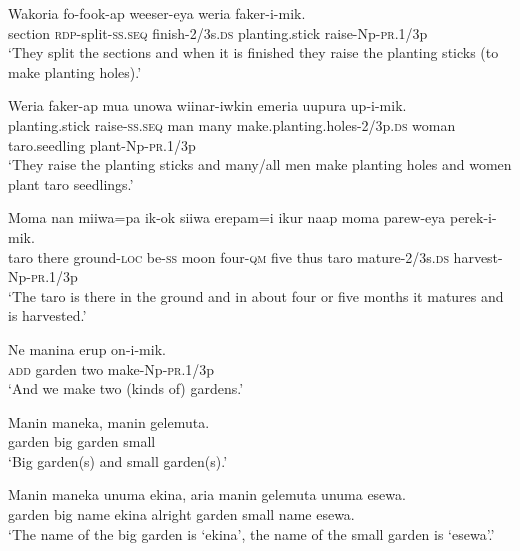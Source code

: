 \ea\label{ex:a:x7}
\gll  Wakoria  fo-fook-ap  weeser-eya  weria  faker-i-mik. \\
section  \textsc{rdp}-split-\textsc{ss.seq}  finish-2/3s.\textsc{ds}  planting.stick  raise-Np-\textsc{pr}.1/3p \\
\glt ‘They split the sections and when it is finished they raise the planting sticks (to make planting holes).’ \\
\z


\ea\label{ex:a:x8}
\gll  Weria  faker-ap  mua  unowa  wiinar-iwkin  emeria                     uupura  up-i-mik. \\
planting.stick  raise-\textsc{ss.seq}  man  many  make.planting.holes-2/3p.\textsc{ds}  woman taro.seedling  plant-Np-\textsc{pr}.1/3p \\


\glt ‘They raise the planting sticks and many/all men make planting holes and women plant taro seedlings.’ \\
\z


\ea\label{ex:a:x9}
\gll  Moma  nan  miiwa=pa  ik-ok  siiwa  erepam=i  ikur  naap  moma parew-eya  perek-i-mik. \\
taro  there  ground-\textsc{loc}  be-\textsc{ss}  moon  four-\textsc{qm}  five  thus  taro     mature-2/3s.\textsc{ds}  harvest-Np-\textsc{pr}.1/3p \\


\glt ‘The taro is there in the ground and in about four or five months it matures and is harvested.’ \\
\z


\ea\label{ex:a:x10}
\gll  Ne  manina  erup  on-i-mik. \\
\textsc{add}  garden  two  make-Np-\textsc{pr}.1/3p \\
\glt ‘And we make two (kinds of) gardens.’ \\
\z


\ea\label{ex:a:x11}
\gll  Manin  maneka,  manin  gelemuta. \\
garden  big  garden  small \\
\glt ‘Big garden(s) and small garden(s).’ \\
\z


\ea\label{ex:a:x12}
\gll  Manin  maneka  unuma  ekina,  aria  manin  gelemuta  unuma  esewa. \\
garden  big  name  ekina  alright  garden  small  name  esewa. \\
\glt ‘The name of the big garden is ‘ekina’, the name of the small garden is ‘esewa’.’ \\
\z


